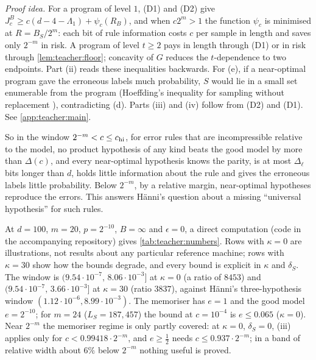 \emph{Proof idea.} For a program of level $1$, (D1) and (D2) give $J^B_c\ge c(d-4-\Lambda_1)+\psi_c(R_B)$, and when $c2^m>1$ the function $\psi_c$ is minimised at $R=B_S/2^m$: each bit of rule information costs $c$ per sample in length and saves only $2^{-m}$ in risk. A program of level $t\ge2$ pays in length through (D1) or in risk through \cref{lem:teacher:floor}; concavity of $G$ reduces the $t$-dependence to two endpoints. Part (ii) reads these inequalities backwards. For (e), if a near-optimal program gave the erroneous labels much probability, $S$ would lie in a small set enumerable from the program (Hoeffding's inequality for sampling without replacement \citep{hoeffding1963probability}), contradicting (d). Parts (iii) and (iv) follow from (D2) and (D1). See \cref{app:teacher:main}.

So in the window $2^{-m}<c\le c_{\rm hi}$, for error rules that are incompressible relative to the model, no product hypothesis of any kind beats the good model by more than $\Delta(c)$, and every near-optimal hypothesis knows the parity, is at most $\Delta_\ell$ bits longer than $d$, holds little information about the rule and gives the erroneous labels little probability. Below $2^{-m}$, by a relative margin, near-optimal hypotheses reproduce the errors. This answers H\"anni's question about a missing ``universal hypothesis'' for such rules.

\begin{remark}\label{rem:teacher:numbers}
At $d=100$, $m=20$, $p=2^{-10}$, $B=\infty$ and $\epsilon=0$, a direct computation (code in the accompanying repository) gives \cref{tab:teacher:numbers}. Rows with $\kappa=0$ are illustrations, not results about any particular reference machine; rows with $\kappa=30$ show how the bounds degrade, and every bound is explicit in $\kappa$ and $\delta_S$. The window is $(9.54\cdot10^{-7},\,8.06\cdot10^{-3}]$ at $\kappa=0$ (a ratio of $8453$) and $(9.54\cdot10^{-7},\,3.66\cdot10^{-3}]$ at $\kappa=30$ (ratio $3837$), against H\"anni's three-hypothesis window $(1.12\cdot10^{-6},8.99\cdot10^{-3})$. The memoriser has $e=1$ and the good model $e=2^{-10}$; for $m=24$ ($L_S=187{,}457$) the bound at $c=10^{-4}$ is $e\le0.065$ ($\kappa=0$). Near $2^{-m}$ the memoriser regime is only partly covered: at $\kappa=0$, $\delta_S=0$, (iii) applies only for $c<0.99418\cdot2^{-m}$, and $e\ge\frac12$ needs $c\le0.937\cdot2^{-m}$; in a band of relative width about $6\%$ below $2^{-m}$ nothing useful is proved.
\end{remark}

